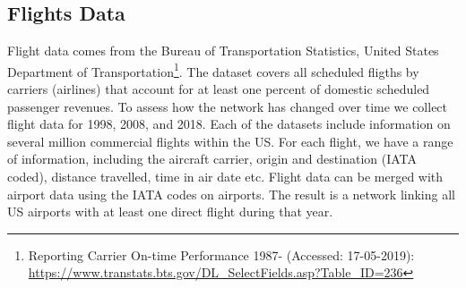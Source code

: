 
\subsection{Flights Data}
\label{subsec:Flight_Data}
Flight data comes from the Bureau of Transportation Statistics, United States Department of Transportation\footnote{Reporting Carrier On-time Performance 1987- (Accessed: 17-05-2019): \url{https://www.transtats.bts.gov/DL_SelectFields.asp?Table_ID=236}}. The dataset covers all scheduled fligths by carriers (airlines) that account for at least one percent of domestic scheduled passenger revenues. To assess how the network has changed over time we collect flight data for 1998, 2008, and 2018. Each of the datasets include information on several million commercial flights within the US. For each flight, we have a range of information, including the aircraft carrier, origin and destination (IATA coded), distance travelled, time in air date etc. Flight data can be merged with airport data using the IATA codes on airports. The result is a network linking all US airports with at least one direct flight during that year.

